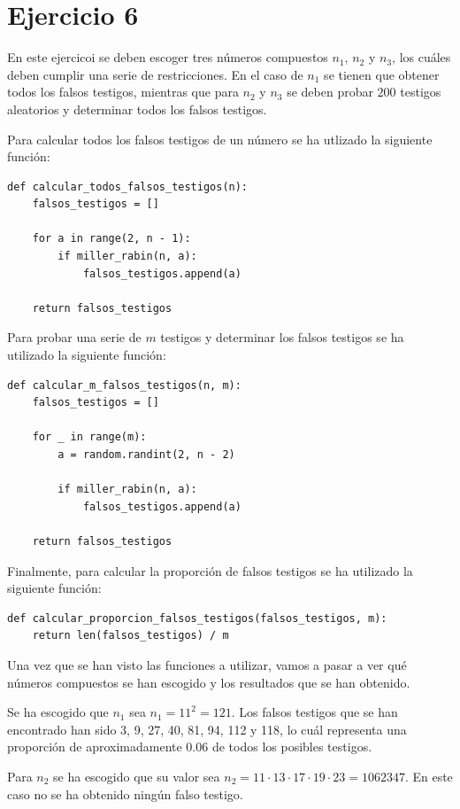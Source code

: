 \documentclass[11pt,a4paper]{article}
\newcommand{\nonumsection}[1]{\section*{#1}\addcontentsline{toc}{section}{#1}}
\begin{document}
\nonumsection{Ejercicio 6}

En este ejercicoi se deben escoger tres números compuestos $n_1$, $n_2$ y $n_3$, los cuáles
deben cumplir una serie de restricciones. En el caso de $n_1$ se tienen que obtener todos los
falsos testigos, mientras que para $n_2$ y $n_3$ se deben probar $200$ testigos aleatorios
y determinar todos los falsos testigos.

Para calcular todos los falsos testigos de un número se ha utlizado la siguiente
función:

\begin{lstlisting}
def calcular_todos_falsos_testigos(n):
    falsos_testigos = []

    for a in range(2, n - 1):
        if miller_rabin(n, a):
            falsos_testigos.append(a)
    
    return falsos_testigos
\end{lstlisting}

Para probar una serie de $m$ testigos y determinar los falsos testigos se ha utilizado la
siguiente función:

\begin{lstlisting}
def calcular_m_falsos_testigos(n, m):
    falsos_testigos = []

    for _ in range(m):
        a = random.randint(2, n - 2)

        if miller_rabin(n, a):
            falsos_testigos.append(a)

    return falsos_testigos
\end{lstlisting}

Finalmente, para calcular la proporción de falsos testigos se ha utilizado la siguiente
función:

\begin{lstlisting}
def calcular_proporcion_falsos_testigos(falsos_testigos, m):
    return len(falsos_testigos) / m
\end{lstlisting}

Una vez que se han visto las funciones a utilizar, vamos a pasar a ver qué números compuestos se
han escogido y los resultados que se han obtenido.

Se ha escogido que $n_1$ sea $n_1 = 11^2 = 121$. Los falsos testigos que se han encontrado han
sido 3, 9, 27, 40, 81, 94, 112 y 118, lo cuál representa una proporción de aproximadamente $0.06$
de todos los posibles testigos.

Para $n_2$ se ha escogido que su valor sea
$n_2 = 11 \cdot 13 \cdot 17 \cdot 19 \cdot 23 = 1062347$. En este caso no se ha obtenido ningún
falso testigo.
\end{document}
